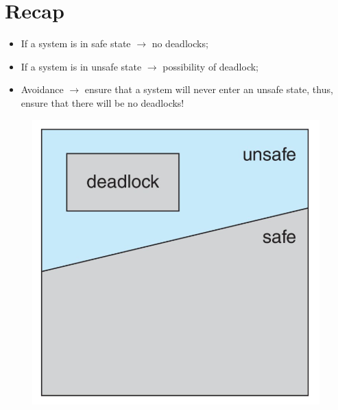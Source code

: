 \section{Recap}

\begin{itemize}
    \item If a system is in safe state $\to$ no deadlocks;
    \item If a system is in unsafe state $\to$ possibility of deadlock;
    \item Avoidance $\to$ ensure that a system will never enter an unsafe state, thus, ensure that there will be no deadlocks!
\end{itemize}

\begin{figure}[htbp]
    \centering
    \includegraphics[width=0.3\linewidth]{img/Dead.png}
\end{figure}